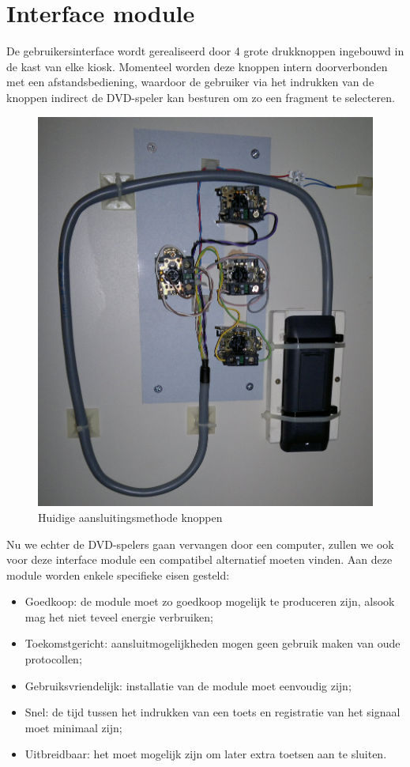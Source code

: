 \documentclass[verslag.tex]{subfiles}
\begin{document}
\section{Interface module}
\label{ontwerp:hardware:interface}

De gebruikersinterface wordt gerealiseerd door 4 grote drukknoppen ingebouwd in de kast van elke kiosk. Momenteel worden deze knoppen intern doorverbonden met een afstandsbediening, waardoor de gebruiker via het indrukken van de knoppen indirect de DVD-speler kan besturen om zo een fragment te selecteren.

\begin{figure}
	\includegraphics[width=\textwidth]{afbeeldingen/kiosk_knoppen}
	\caption{Huidige aansluitingsmethode knoppen}
\end{figure}

Nu we echter de DVD-spelers gaan vervangen door een computer, zullen we ook voor deze interface module een compatibel alternatief moeten vinden. Aan deze module worden enkele specifieke eisen gesteld:
\begin{itemize}
\item Goedkoop: de module moet zo goedkoop mogelijk te produceren zijn, alsook mag het niet teveel energie verbruiken;
\item Toekomstgericht: aansluitmogelijkheden mogen geen gebruik maken van oude protocollen;
\item Gebruiksvriendelijk: installatie van de module moet eenvoudig zijn;
\item Snel: de tijd tussen het indrukken van een toets en registratie van het signaal moet minimaal zijn;
\item Uitbreidbaar: het moet mogelijk zijn om later extra toetsen aan te sluiten.
\end{itemize}
\end{document}
